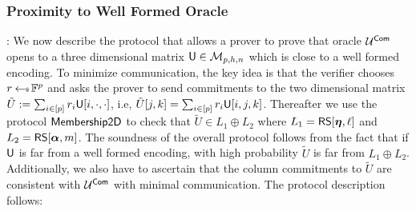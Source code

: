 \subsubsection{Proximity to Well Formed Oracle}: We now describe the protocol
that allows a prover to prove that oracle $\mathcal{U}^{\mathsf{Com}}$ opens to a three
dimensional matrix $\mathsf{U}\in \mathcal{M}_{p,h,n}$ which is close to a well formed
encoding. To minimize communication, the key idea is that the verifier chooses
$r\hskip2.3pt{\gets\!\!\mbox{\tiny${\$}$\normalsize}}\, \mathbb{F}^p$ and asks the prover to send commitments to the two dimensional
matrix $\tilde{U}:=\sum_{i\in [p]}r_i\mathsf{U}[i,\cdot,\cdot]$, i.e,
$\tilde{U}[j,k]=\sum_{i\in [p]}r_i\mathsf{U}[i,j,k]$. Thereafter we use the protocol
$\mathsf{Membership2D}$ to check that $\tilde{U}\in L_1\oplus L_2$ where
$L_1=\mathsf{RS}[\bm{\eta},\ell]$ and $L_2=\mathsf{RS}[\bm{\alpha},m]$. The soundness of the overall
protocol follows from the fact that if $\mathsf{U}$ is far from a well formed
encoding, with high probability $\tilde{U}$ is far from $L_1\oplus L_2$.
Additionally, we also have to ascertain that the column commitments to
$\tilde{U}$ are consistent with $\mathcal{U}^{\mathsf{Com}}$ with minimal communication. The
protocol description follows:

